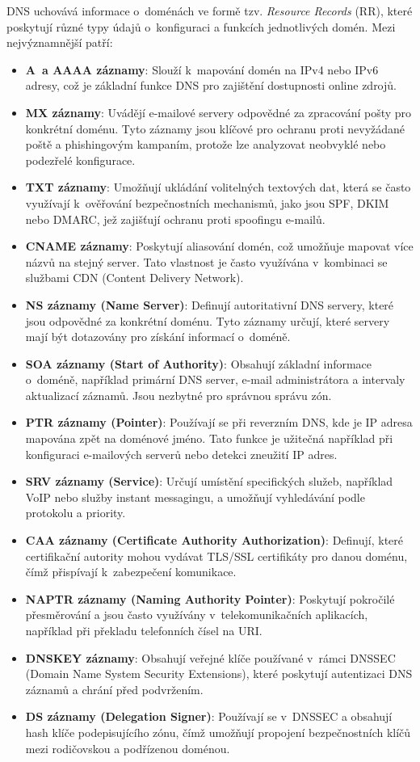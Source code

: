 DNS uchovává informace o~doménách ve formě tzv. \emph{Resource Records} (RR), které poskytují různé typy údajů o~konfiguraci a funkcích jednotlivých domén. Mezi nejvýznamnější patří:
\begin{itemize}
    \item \textbf{A~a AAAA záznamy}: Slouží k~mapování domén na IPv4 nebo IPv6 adresy, což je základní funkce DNS pro zajištění dostupnosti online zdrojů.
    \item \textbf{MX záznamy}: Uvádějí e-mailové servery odpovědné za zpracování pošty pro konkrétní doménu. Tyto záznamy jsou klíčové pro ochranu proti nevyžádané poště a phishingovým kampaním, protože lze analyzovat neobvyklé nebo podezřelé konfigurace.
    \item \textbf{TXT záznamy}: Umožňují ukládání volitelných textových dat, která se často využívají k~ověřování bezpečnostních mechanismů, jako jsou SPF, DKIM nebo DMARC, jež zajišťují ochranu proti spoofingu e-mailů.
    \item \textbf{CNAME záznamy}: Poskytují aliasování domén, což umožňuje mapovat více názvů na stejný server. Tato vlastnost je často využívána v~kombinaci se službami CDN (Content Delivery Network).
    \item \textbf{NS záznamy (Name Server)}: Definují autoritativní DNS servery, které jsou odpovědné za konkrétní doménu. Tyto záznamy určují, které servery mají být dotazovány pro získání informací o~doméně.
    \item \textbf{SOA záznamy (Start of Authority)}: Obsahují základní informace o~doméně, například primární DNS server, e-mail administrátora a intervaly aktualizací záznamů. Jsou nezbytné pro správnou správu zón.
    \item \textbf{PTR záznamy (Pointer)}: Používají se při reverzním DNS, kde je IP adresa mapována zpět na doménové jméno. Tato funkce je užitečná například při konfiguraci e-mailových serverů nebo detekci zneužití IP adres.
    \item \textbf{SRV záznamy (Service)}: Určují umístění specifických služeb, například VoIP nebo služby instant messagingu, a umožňují vyhledávání podle protokolu a priority.
    \item \textbf{CAA záznamy (Certificate Authority Authorization)}: Definují, které certifikační autority mohou vydávat TLS/SSL certifikáty pro danou doménu, čímž přispívají k~zabezpečení komunikace.
    \item \textbf{NAPTR záznamy (Naming Authority Pointer)}: Poskytují pokročilé přesměrování a jsou často využívány v~telekomunikačních aplikacích, například při překladu telefonních čísel na URI.
    \item \textbf{DNSKEY záznamy}: Obsahují veřejné klíče používané v~rámci DNSSEC (Domain Name System Security Extensions), které poskytují autentizaci DNS záznamů a chrání před podvržením.
    \item \textbf{DS záznamy (Delegation Signer)}: Používají se v~DNSSEC a obsahují hash klíče podepisujícího zónu, čímž umožňují propojení bezpečnostních klíčů mezi rodičovskou a podřízenou doménou.
\end{itemize}


